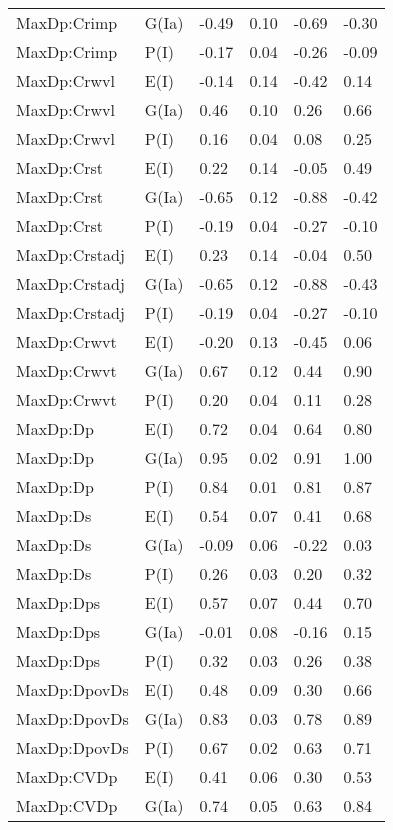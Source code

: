 \begin{center}
\begin{longtable}{|p{1.1in}|p{0.7in}|p{0.7in}|p{0.6in}|p{0.6in}|p{0.6in}|}
  MaxDp:Crimp & G(Ia) & -0.49 & 0.10 & -0.69 & -0.30 \\ 
  MaxDp:Crimp & P(I) & -0.17 & 0.04 & -0.26 & -0.09 \\ 
  MaxDp:Crwvl & E(I) & -0.14 & 0.14 & -0.42 & 0.14 \\ 
  MaxDp:Crwvl & G(Ia) & 0.46 & 0.10 & 0.26 & 0.66 \\ 
  MaxDp:Crwvl & P(I) & 0.16 & 0.04 & 0.08 & 0.25 \\ 
  MaxDp:Crst & E(I) & 0.22 & 0.14 & -0.05 & 0.49 \\ 
  MaxDp:Crst & G(Ia) & -0.65 & 0.12 & -0.88 & -0.42 \\ 
  MaxDp:Crst & P(I) & -0.19 & 0.04 & -0.27 & -0.10 \\ 
  MaxDp:Crstadj & E(I) & 0.23 & 0.14 & -0.04 & 0.50 \\ 
  MaxDp:Crstadj & G(Ia) & -0.65 & 0.12 & -0.88 & -0.43 \\ 
  MaxDp:Crstadj & P(I) & -0.19 & 0.04 & -0.27 & -0.10 \\ 
  MaxDp:Crwvt & E(I) & -0.20 & 0.13 & -0.45 & 0.06 \\ 
  MaxDp:Crwvt & G(Ia) & 0.67 & 0.12 & 0.44 & 0.90 \\ 
  MaxDp:Crwvt & P(I) & 0.20 & 0.04 & 0.11 & 0.28 \\ 
  MaxDp:Dp & E(I) & 0.72 & 0.04 & 0.64 & 0.80 \\ 
  MaxDp:Dp & G(Ia) & 0.95 & 0.02 & 0.91 & 1.00 \\ 
  MaxDp:Dp & P(I) & 0.84 & 0.01 & 0.81 & 0.87 \\ 
  MaxDp:Ds & E(I) & 0.54 & 0.07 & 0.41 & 0.68 \\ 
  MaxDp:Ds & G(Ia) & -0.09 & 0.06 & -0.22 & 0.03 \\ 
  MaxDp:Ds & P(I) & 0.26 & 0.03 & 0.20 & 0.32 \\ 
  MaxDp:Dps & E(I) & 0.57 & 0.07 & 0.44 & 0.70 \\ 
  MaxDp:Dps & G(Ia) & -0.01 & 0.08 & -0.16 & 0.15 \\ 
  MaxDp:Dps & P(I) & 0.32 & 0.03 & 0.26 & 0.38 \\ 
  MaxDp:DpovDs & E(I) & 0.48 & 0.09 & 0.30 & 0.66 \\ 
  MaxDp:DpovDs & G(Ia) & 0.83 & 0.03 & 0.78 & 0.89 \\ 
  MaxDp:DpovDs & P(I) & 0.67 & 0.02 & 0.63 & 0.71 \\ 
  MaxDp:CVDp & E(I) & 0.41 & 0.06 & 0.30 & 0.53 \\ 
  MaxDp:CVDp & G(Ia) & 0.74 & 0.05 & 0.63 & 0.84 \\ 

\end{longtable}
\end{center}
